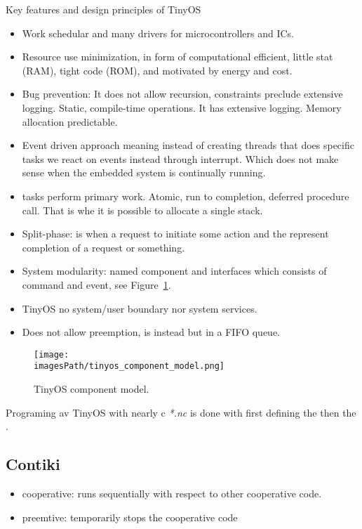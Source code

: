 Key features and design principles of TinyOS
\begin{itemize}
    \item Work schedular and many drivers for microcontrollers and ICs.
    \item Resource use minimization, in form of computational efficient, little stat (RAM), tight code (ROM), and motivated by energy and cost.
    \item Bug prevention: It does not allow recursion, constraints preclude extensive logging. Static, compile-time operations.
    It has extensive logging. Memory allocation predictable.
    \item Event driven approach meaning instead of creating threads that does specific tasks we react on events instead through interrupt.
    Which does not make sense when the embedded system is continually running.
    \item tasks perform primary work. Atomic, run to completion, deferred procedure call.
    That is whe it is possible to allocate a single stack.
    \item Split-phase: is when a  request to initiate some action  and the  represent completion of a request or something.
    \item System modularity: named component and interfaces which consists of command and event, see Figure~\ref{fig:tinyos_component_model}.
    \item TinyOS no system/user boundary nor system services.
    \item Does not allow preemption, is instead but in a FIFO queue. 
\end{itemize}


\begin{figure}[H]
    \centering
    \texttt{[image: \\imagesPath/tinyos\_component\_model.png]}
    \caption{TinyOS component model.}
    \label{fig:tinyos_component_model}
\end{figure}

Programing av TinyOS with nearly c \textit{*.nc} is done with first defining the 
then the . 




\subsection{Contiki}
\begin{itemize}
    \item cooperative: runs sequentially with respect to other cooperative code.
    \item preemtive: temporarily stops the cooperative code
\end{itemize}

